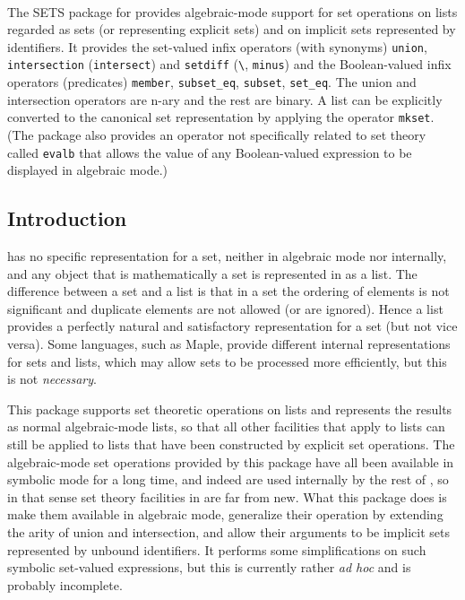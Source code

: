 \


  The SETS package for \REDUCE provides
  algebraic-mode support for set operations on lists regarded as sets
  (or representing explicit sets) and on implicit sets represented by
  identifiers.  It provides the set-valued infix operators (with
  synonyms) \texttt{union}, \texttt{intersection} (\texttt{intersect}) and
  \texttt{setdiff} (\texttt{\textbackslash}, \texttt{minus}) and the Boolean-valued infix
  operators (predicates) \texttt{member}, \texttt{subset\_eq}, \texttt{subset},
  \texttt{set\_eq}.  The union and intersection operators are n-ary and
  the rest are binary.  A list can be explicitly converted to the
  canonical set representation by applying the operator \texttt{mkset}.
  (The package also provides an operator not specifically related to
  set theory called \texttt{evalb} that allows the value of any
  Boolean-valued expression to be displayed in algebraic mode.)


\subsection{Introduction}

\REDUCE has no specific representation for a set, neither in algebraic
mode nor internally, and any object that is mathematically a set is
represented in \REDUCE as a list.  The difference between a set and a
list is that in a set the ordering of elements is not significant and
duplicate elements are not allowed (or are ignored).  Hence a list
provides a perfectly natural and satisfactory representation for a set
(but not vice versa).  Some languages, such as Maple, provide
different internal representations for sets and lists, which may allow
sets to be processed more efficiently, but this is not \emph{necessary}.

This package supports set theoretic operations on lists and represents
the results as normal algebraic-mode lists, so that all other \REDUCE
facilities that apply to lists can still be applied to lists that have
been constructed by explicit set operations.  The algebraic-mode set
operations provided by this package have all been available in
symbolic mode for a long time, and indeed are used internally by the
rest of \REDUCE, so in that sense set theory facilities in \REDUCE are
far from new.  What this package does is make them available in
algebraic mode, generalize their operation by extending the arity of
union and intersection, and allow their arguments to be implicit sets
represented by unbound identifiers.  It performs some simplifications
on such symbolic set-valued expressions, but this is currently rather
\emph{ad hoc} and is probably incomplete.

